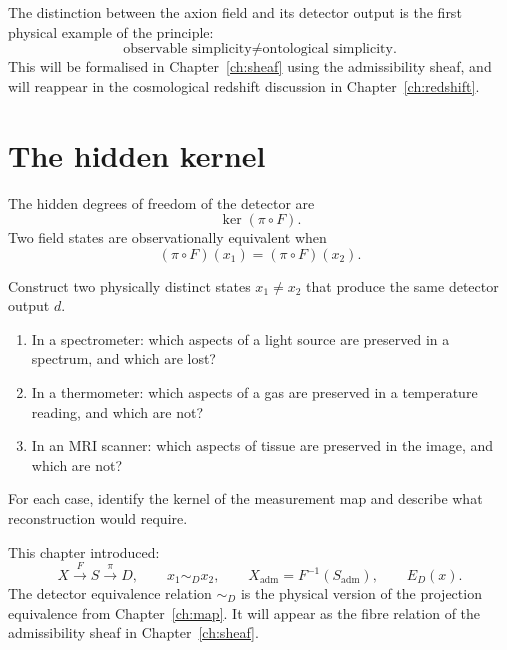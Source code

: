 \begin{AdmPreview}
  The distinction between the axion field and its detector
  output is the first physical example of the principle:
  \[
    \text{observable simplicity}
    \neq
    \text{ontological simplicity.}
  \]
  This will be formalised in Chapter~\ref{ch:sheaf} using the
  admissibility sheaf, and will reappear in the cosmological
  redshift discussion in Chapter~\ref{ch:redshift}.
\end{AdmPreview}

\section{The hidden kernel}

The hidden degrees of freedom of the detector are
\[
  \ker(\pi \circ F).
\]
Two field states are observationally equivalent when
\[
  (\pi \circ F)(x_1) = (\pi \circ F)(x_2).
\]

\begin{ReconExercise}
  Construct two physically distinct states $x_1 \neq x_2$
  that produce the same detector output $d$.
  \begin{enumerate}[leftmargin=2em]
    \item In a spectrometer: which aspects of a light source
      are preserved in a spectrum, and which are lost?
    \item In a thermometer: which aspects of a gas are
      preserved in a temperature reading, and which are not?
    \item In an MRI scanner: which aspects of tissue are
      preserved in the image, and which are not?
  \end{enumerate}
  For each case, identify the kernel of the measurement map
  and describe what reconstruction would require.
\end{ReconExercise}

\begin{MathEcho}
  This chapter introduced:
  \[
    X \xrightarrow{F} S \xrightarrow{\pi} D,
    \qquad
    x_1 \sim_D x_2,
    \qquad
    X_{\mathrm{adm}} = F^{-1}(S_{\mathrm{adm}}),
    \qquad
    E_D(x).
  \]
  The detector equivalence relation $\sim_D$ is the physical
  version of the projection equivalence from
  Chapter~\ref{ch:map}.
  It will appear as the fibre relation of the admissibility
  sheaf in Chapter~\ref{ch:sheaf}.
\end{MathEcho}

